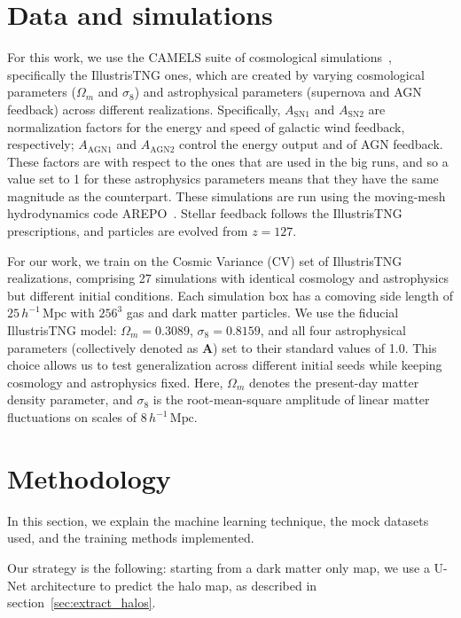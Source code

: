 \section{Data and simulations}
\label{sec:dataset_camels}
For this work, we use the CAMELS suite of cosmological
simulations~\citep{villaescusa-navarro_camels_2022}, specifically the IllustrisTNG ones, which are created by varying cosmological parameters ($\Omega_m$ and $\sigma_8$) and astrophysical parameters (supernova and AGN feedback) across different realizations. Specifically, $A_{\mathrm{SN1}}$ and $A_{\mathrm{SN2}}$ are normalization factors for the energy and speed of galactic wind feedback, respectively; $A_{\mathrm{AGN1}}$ and $A_{\mathrm{AGN2}}$ control the energy output and of AGN feedback. These factors are with respect to the ones that are used in the big \TNG runs, and so a value set to 1 for these astrophysics parameters means that they have the same magnitude as the \TNG counterpart. These simulations are run using the moving-mesh hydrodynamics code AREPO~\citep{weinberger_arepo_2020}. Stellar feedback follows the IllustrisTNG prescriptions, and particles are evolved from $z=127$.

For our work, we train on the Cosmic Variance (CV) set of IllustrisTNG
realizations, comprising 27 simulations with identical cosmology and
astrophysics but different initial conditions. Each simulation box has a
comoving side length of $25\,h^{-1}\,\mathrm{Mpc}$ with $256^3$ gas and dark matter particles. We use the fiducial IllustrisTNG model: $\Omega_m = 0.3089$, $\sigma_8 = 0.8159$, and all four astrophysical parameters (collectively denoted as $\mathbf{A}$) set to their standard values of 1.0. This choice allows us to test generalization across different initial seeds while keeping cosmology and astrophysics fixed. Here, $\Omega_m$ denotes the present-day matter density parameter, and $\sigma_8$ is the root-mean-square amplitude of linear matter fluctuations on scales of $8\,h^{-1}\,\mathrm{Mpc}$.


\section{Methodology}
\label{methodology}
In this section, we explain the machine learning technique, the mock datasets used, and the training methods implemented.

Our strategy is the following: starting from a dark matter only map, we use a U-Net architecture to predict the halo map, as described in section~\ref{sec:extract_halos}.

